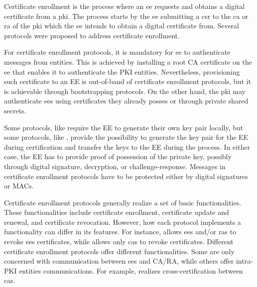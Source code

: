 Certificate enrollment is the process where an \gls{ee} requests and obtains a digital certificate from a \gls{pki}. The process starts by the \gls{ee} submitting a \gls{csr} to the \gls{ca} or \gls{ra} of the \gls{pki} which the \gls{ee} intends to obtain a digital certificate from. Several protocols \cite{rfc7030,rfc4210,rfc8894,rfc5272} were proposed to address certificate enrollment.
\par
For certificate enrollment protocols, it is mandatory for \gls{ee} to authenticate messages from  entities. This is achieved by installing a root CA certificate on the \gls{ee} that enables it to authenticate the PKI entities. Nevertheless, provisioning such certificate to an EE is out-of-band of certificate enrollment protocols, but it is achievable through bootstrapping protocols. On the other hand, the \gls{pki} may authenticate \glspl{ee} using certificates they already posses or through private shared secrets.
\par
Some protocols, like \cite{rfc8894} require the EE to generate their own key pair locally, but some protocols, like \cite{rfc7030,rfc4210}, provide the possibility to generate the key pair for the EE during certification and transfer the keys to the EE during the process. In either case, the EE has to provide proof of possession of the private key, possibly through digital signature, decryption, or challenge-response.
Messages in certificate enrollment protocols have to be protected either by digital signatures or MACs.
\par
Certificate enrollment protocols generally realize a set of basic functionalities. These functionalities include certificate enrollment, certificate update and renewal, and certificate revocation. However, how each protocol implements a functionality can differ in its features. For instance, \cite{rfc5272} allows \glspl{ee} and/or \glspl{ra} to revoke \glspl{ee} certificates, while \cite{rfc8894} allows only \glspl{ca} to revoke certificates.
Different certificate enrollment protocols offer different functionalities. Some are only concerned with communication between \glspl{ee} and CA/RA, while others offer intra-PKI entities communications. For example, \cite{rfc4210} realizes cross-certification between \glspl{ca}.